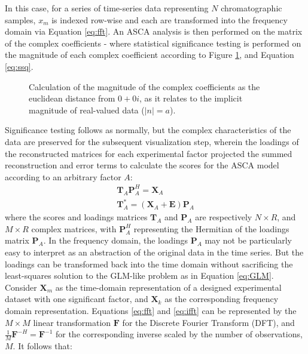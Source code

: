 \documentclass[preprint,12pt]{elsarticle}
\begin{document}
In this case, for a series of time-series data representing $N$ chromatographic samples, $x_m$ is indexed row-wise and each are transformed into the frequency domain via Equation \ref{eq:fft}. An ASCA analysis is then performed on the matrix of the complex coefficients - where statistical significance testing is performed on the magnitude of each complex coefficient according to Figure \ref{fig:imag}, and Equation \ref{eq:ssq}.

\begin{figure}[tbh!]
\centering


\caption{Calculation of the magnitude of the complex coefficients as the euclidean distance from $0 + 0i$, as it relates to the implicit magnitude of real-valued data ($|n|=a$).}
\label{fig:imag}
\end{figure}

Significance testing follows as normally, but the complex characteristics of the data are preserved for the subsequent visualization step, wherein the loadings of the reconstructed matrices for each experimental factor projected the summed reconstruction and error terms to calculate the scores for the ASCA model according to an arbitrary factor $A$:
%
\begin{align}\label{eq:asca}
    \mathbf{T}_A\mathbf{P}_A^H = \mathbf{X}_A \\
    \mathbf{T}^*_A = (\mathbf{X}_A + \mathbf{E})\mathbf{P}_A
\end{align}
%
\noindent where the scores and loadings matrices $\mathbf{T}_A$ and $\mathbf{P}_A$ are respectively $N \times R$, and $M \times R$ complex matrices, with $\mathbf{P}_A^H$ representing the Hermitian of the loadings matrix $\mathbf{P}_A$. In the frequency domain, the loadings $\mathbf{P}_A$ may not be particularly easy to interpret as an abstraction of the original data in the time series. But the loadings can be transformed back into the time domain without sacrificing the least-squares solution to the GLM-like problem as in Equation \ref{eq:GLM}. Consider $\mathbf{X}_m$ as the time-domain representation of a designed experimental dataset with one significant factor, and $\mathbf{X}_k$ as the corresponding frequency domain representation. Equations \ref{eq:fft} and \ref{eq:ifft} can be represented by the $M\times M$ linear transformation $\mathbf{F}$ for the Discrete Fourier Transform (DFT), and $\frac{1}{M}\mathbf{F}^{-H} = \mathbf{F}^{-1}$ for the corresponding inverse scaled by the number of observations, $M$. It follows that:
\end{document}
